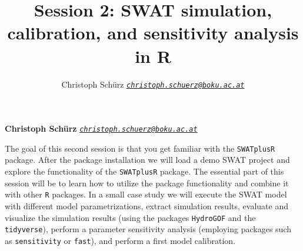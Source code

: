 \documentclass[11pt,]{article}
\title{Session 2: SWAT simulation, calibration, and sensitivity analysis in R  }
\author{\Large Christoph Schürz\vspace{0.05in} \newline\normalsize\emph{\href{mailto:christoph.schuerz@boku.ac.at}{\nolinkurl{christoph.schuerz@boku.ac.at}}}  }
\date{}
\newcommand*{\authorfont}{\fontfamily{phv}\selectfont}
\renewenvironment{abstract}
 {{%
    \setlength{\leftmargin}{0mm}
    \setlength{\rightmargin}{\leftmargin}%
  }%
  \relax}
 {\endlist}
\begin{document}
%

{%
\setlength{\parindent}{0pt}
\thispagestyle{plain}
{\fontsize{18}{20}\selectfont\raggedright
\maketitle  %

}

{
   \vskip 13.5pt\relax \normalsize\fontsize{11}{12}
\textbf{\authorfont Christoph Schürz} \hskip 15pt \emph{\small \href{mailto:christoph.schuerz@boku.ac.at}{\nolinkurl{christoph.schuerz@boku.ac.at}}}   

}

}








\begin{abstract}

    \hbox{\vrule height .2pt width 39.14pc}

    \vskip 8.5pt %

\noindent The goal of this second session is that you get familiar with the
\texttt{SWATplusR} package. After the package installation we will load
a demo SWAT project and explore the functionality of the
\texttt{SWATplusR} package. The essential part of this session will be
to learn how to utilize the package functionality and combine it with
other \texttt{R} packages. In a small case study we will execute the
SWAT model with different model parametrizations, extract simulation
results, evaluate and visualize the simulation results (using the
packages \texttt{HydroGOF} and the \texttt{tidyverse}), perform a
parameter sensitivity analysis (employing packages such as
\texttt{sensitivity} or \texttt{fast}), and perform a first model
calibration.


    \hbox{\vrule height .2pt width 39.14pc}


\end{abstract}


\vskip 6.5pt

{
\hypersetup{linkcolor=black}
\setcounter{tocdepth}{2}
\tableofcontents
}

\noindent  \newpage
\end{document}
